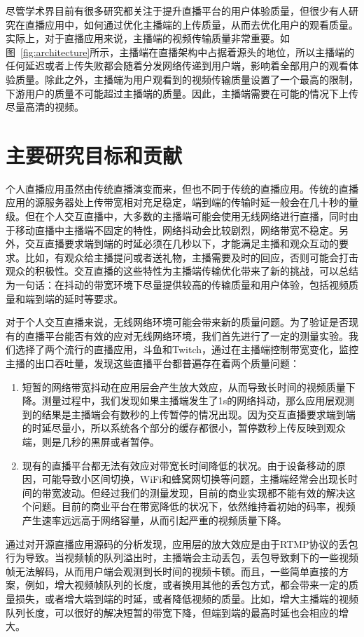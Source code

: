 尽管学术界目前有很多研究都关注于提升直播平台的用户体验质量，但很少有人研究在直播应用中，如何通过优化主播端的上传质量，从而去优化用户的观看质量。实际上，对于直播应用来说，主播端的视频传输质量非常重要。如图~\ref{fig:architecture}所示，主播端在直播架构中占据着源头的地位，所以主播端的任何延迟或者上传失败都会随着分发网络传递到用户端，影响着全部用户的观看体验质量。除此之外，主播端为用户观看到的视频传输质量设置了一个最高的限制，下游用户的质量不可能超过主播端的质量。因此，主播端需要在可能的情况下上传尽量高清的视频。

\section{主要研究目标和贡献}
个人直播应用虽然由传统直播演变而来，但也不同于传统的直播应用。传统的直播应用的源服务器处上传带宽相对充足稳定，端到端的传输时延一般会在几十秒的量级。但在个人交互直播中，大多数的主播端可能会使用无线网络进行直播，同时由于移动直播中主播端不固定的特性，网络抖动会比较剧烈，网络带宽不稳定。另外，交互直播要求端到端的时延必须在几秒以下，才能满足主播和观众互动的要求。比如，有观众给主播提问或者送礼物，主播需要及时的回应，否则可能会打击观众的积极性。交互直播的这些特性为主播端传输优化带来了新的挑战，可以总结为一句话：在抖动的带宽环境下尽量提供较高的传输质量和用户体验，包括视频质量和端到端的延时等要求。

对于个人交互直播来说，无线网络环境可能会带来新的质量问题。为了验证是否现有的直播平台能否有效的应对无线网络环境，我们首先进行了一定的测量实验。我们选择了两个流行的直播应用，斗鱼和Twitch，通过在主播端控制带宽变化，监控主播的出口吞吐量，发现这些直播平台都普遍存在着两个质量问题：
\begin{enumerate}[1)]
  \item 短暂的网络带宽抖动在应用层会产生放大效应，从而导致长时间的视频质量下降。测量过程中，我们发现如果主播端发生了1s的网络抖动，那么应用层观测到的结果是主播端会有数秒的上传暂停的情况出现。因为交互直播要求端到端的时延尽量小，所以系统各个部分的缓存都很小，暂停数秒上传反映到观众端，则是几秒的黑屏或者暂停。
  \item 现有的直播平台都无法有效应对带宽长时间降低的状况。由于设备移动的原因，可能导致小区间切换，WiFi和蜂窝网切换等问题，主播端经常会出现长时间的带宽波动。但经过我们的测量发现，目前的商业实现都不能有效的解决这个问题。目前的商业平台在带宽降低的状况下，依然维持着初始的码率，视频产生速率远远高于网络容量，从而引起严重的视频质量下降。
\end{enumerate}

通过对开源直播应用源码的分析发现，应用层的放大效应是由于RTMP协议的丢包行为导致。当视频帧的队列溢出时，主播端会主动丢包，丢包导致剩下的一些视频帧无法解码，从而用户端会观测到长时间的视频卡顿。而且，一些简单直接的方案，例如，增大视频帧队列的长度，或者换用其他的丢包方式，都会带来一定的质量损失，或者增大端到端的时延，或者降低视频的质量。比如，增大主播端的视频队列长度，可以很好的解决短暂的带宽下降，但端到端的最高时延也会相应的增大。

